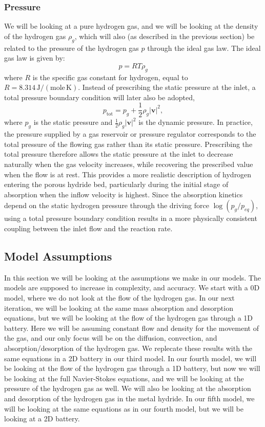 \subsubsection*{Pressure}
We will be looking at a pure hydrogen gas, and we will be looking at the density of the hydrogen gas $\rho_g$, which will also (as described in the previous section) be related to the pressure of the hydrogen gas $p$ through the ideal gas law. The ideal gas law is given by:
\begin{equation}\label{eq:phy_ideal_gas}
    p = R T \rho_g
\end{equation}
where $R$ is the specific gas constant for hydrogen, equal to $R = 8.314 \, \mathrm{J/(mole \, K)}$. Instead of prescribing the static pressure at the inlet, a total pressure boundary condition will later also be adopted\cite{Ferziger2020},
\begin{equation}
    p_{\mathrm{tot}} = p_g + \frac{1}{2}\rho_g |\mathbf{v}|^2,
\end{equation}
where $p_g$ is the static pressure and $\frac{1}{2}\rho_g|\mathbf{v}|^2$ is the dynamic pressure. In practice, the pressure supplied by a gas reservoir or pressure regulator corresponds to the total pressure of the flowing gas rather than its static pressure. Prescribing the total pressure therefore allows the static pressure at the inlet to decrease naturally when the gas velocity increases, while recovering the prescribed value when the flow is at rest. This provides a more realistic description of hydrogen entering the porous hydride bed, particularly during the initial stage of absorption when the inflow velocity is highest. Since the absorption kinetics depend on the static hydrogen pressure through the driving force $\log(p_g/p_{eq})$, using a total pressure boundary condition results in a more physically consistent coupling between the inlet flow and the reaction rate.

\subsection{Model Assumptions}

In this section we will be looking at the assumptions we make in our models. The models are supposed to increase in complexity, and accuracy. We start with a 0D model, where we do not look at the flow of the hydrogen gas. In our next iteration, we will be looking at the same mass absorption and desorption equations, but we will be looking at the flow of the hydrogen gas through a 1D battery. Here we will be assuming constant flow and density for the movement of the gas, and our only focus will be on the diffusion, convection, and absorption/desorption of the hydrogen gas. We replecate these results with the same equations in a 2D battery in our third model. In our fourth model, we will be looking at the flow of the hydrogen gas through a 1D battery, but now we will be looking at the full Navier-Stokes equations, and we will be looking at the pressure of the hydrogen gas as well. We will also be looking at the absorption and desorption of the hydrogen gas in the metal hydride. In our fifth model, we will be looking at the same equations as in our fourth model, but we will be looking at a 2D battery.

